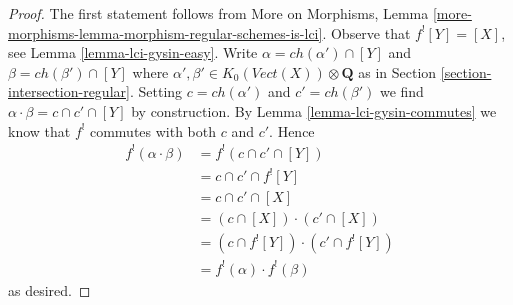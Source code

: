 \documentclass[10pt,a4paper]{amsart}
\theoremstyle{plain}
\theoremstyle{definition}
\theoremstyle{remark}
\numberwithin{equation}{subsection}
\begin{document}
\begin{proof}
The first statement follows from
More on Morphisms, Lemma
\ref{more-morphisms-lemma-morphism-regular-schemes-is-lci}.
Observe that $f^![Y] = [X]$, see Lemma \ref{lemma-lci-gysin-easy}.
Write $\alpha = ch(\alpha') \cap [Y]$ and $\beta = ch(\beta') \cap [Y]$
where $\alpha', \beta' \in K_0(\textit{Vect}(X)) \otimes \mathbf{Q}$
as in Section \ref{section-intersection-regular}.
Setting $c = ch(\alpha')$ and $c' = ch(\beta')$ we find
$\alpha \cdot \beta = c \cap c' \cap [Y]$ by construction.
By Lemma \ref{lemma-lci-gysin-commutes} we know that $f^!$
commutes with both $c$ and $c'$. Hence
\begin{align*}
f^!(\alpha \cdot \beta)
& =
f^!(c \cap c' \cap [Y]) \\
& =
c \cap c' \cap f^![Y] \\
& =
c \cap c' \cap [X] \\
& =
(c \cap [X]) \cdot (c' \cap [X]) \\
& =
(c \cap f^![Y]) \cdot (c' \cap f^![Y]) \\
& =
f^!(\alpha) \cdot f^!(\beta)
\end{align*}
as desired.
\end{proof}
\end{document}
